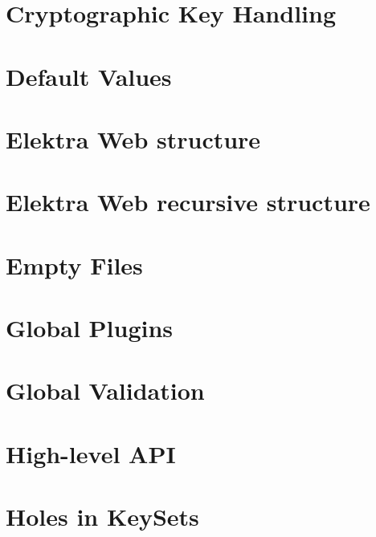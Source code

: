 \documentclass[twoside]{book}
\newcommand{\+}{\discretionary{\mbox{\scriptsize$\hookleftarrow$}}{}{}}
\begin{document}
\chapter{Cryptographic Key Handling}
\label{doc_decisions_cryptograhic_key_handling_md}

\chapter{Default Values}
\label{doc_decisions_default_values_md}

\chapter{Elektra Web structure}
\label{doc_decisions_elektra_web_md}

\chapter{Elektra Web recursive structure}
\label{doc_decisions_elektra_web_recursive_md}

\chapter{Empty Files}
\label{doc_decisions_empty_files_md}

\chapter{Global Plugins}
\label{doc_decisions_global_plugins_md}

\chapter{Global Validation}
\label{doc_decisions_global_validation_md}

\chapter{High-\/level A\+PI}
\label{doc_decisions_high_level_api_md}

\chapter{Holes in Key\+Sets}
\label{doc_decisions_holes_md}

\end{document}
